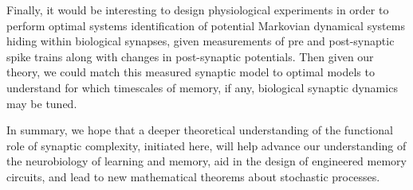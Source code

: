 \documentclass[9pt,twocolumn,twoside,lineno]{pnas-new}
\begin{document}
Finally, it would be interesting to design physiological experiments in order to perform optimal systems identification of potential Markovian dynamical systems hiding within biological synapses,
given measurements of pre and post-synaptic spike trains along with changes in post-synaptic potentials.
Then given our theory, we could match this measured synaptic model to optimal models to understand for which timescales of memory, if any, biological synaptic dynamics may be tuned.

In summary, we hope that a deeper theoretical understanding of the functional role of synaptic complexity, initiated here, will help advance our understanding of the neurobiology of learning and memory, aid in the design of engineered memory circuits, and lead to new mathematical theorems about stochastic processes.


\showacknow %


%



\clearpage
\end{document}
